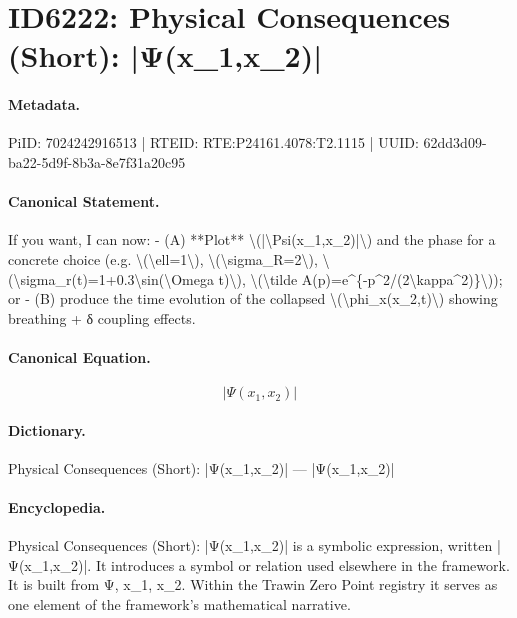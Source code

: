 \section*{ID6222: Physical Consequences (Short): |Ψ(x\_1,x\_2)|}
\paragraph{Metadata.}
PiID: 7024242916513 | RTEID: RTE:P24161.4078:T2.1115 | UUID: 62dd3d09-ba22-5d9f-8b3a-8e7f31a20c95

\paragraph{Canonical Statement.}
If you want, I can now: - (A) **Plot** \textbackslash{}(|\textbackslash{}Psi(x\_1,x\_2)|\textbackslash{}) and the phase for a concrete choice (e.g. \textbackslash{}(\textbackslash{}ell=1\textbackslash{}), \textbackslash{}(\textbackslash{}sigma\_R=2\textbackslash{}), \textbackslash{}(\textbackslash{}sigma\_r(t)=1+0.3\textbackslash{}sin(\textbackslash{}Omega t)\textbackslash{}), \textbackslash{}(\textbackslash{}tilde A(p)=e\textasciicircum{}\{-p\textasciicircum{}2/(2\textbackslash{}kappa\textasciicircum{}2)\}\textbackslash{})); or - (B) produce the time evolution of the collapsed \textbackslash{}(\textbackslash{}phi\_x(x\_2,t)\textbackslash{}) showing breathing + δ coupling effects.

\paragraph{Canonical Equation.}
\[
|\Psi(x_1,x_2)|
\]

\paragraph{Dictionary.}
Physical Consequences (Short): |Ψ(x\_1,x\_2)| — |Ψ(x\_1,x\_2)|

\paragraph{Encyclopedia.}
Physical Consequences (Short): |Ψ(x\_1,x\_2)| is a symbolic expression, written |Ψ(x\_1,x\_2)|. It introduces a symbol or relation used elsewhere in the framework. It is built from Ψ, x\_1, x\_2. Within the Trawin Zero Point registry it serves as one element of the framework's mathematical narrative.
